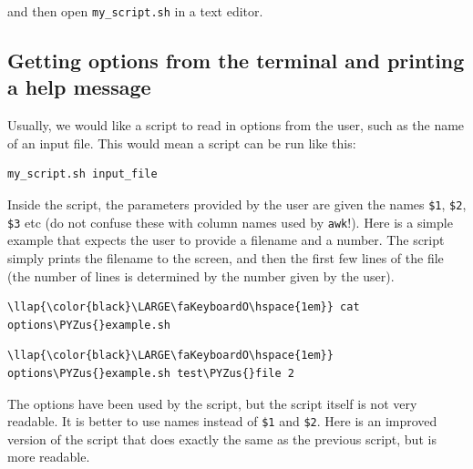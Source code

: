 \documentclass[11pt]{article}
\def\PYZus{\char`\_}
\begin{document}
and then open \texttt{my\_script.sh} in a text editor.

    \hypertarget{getting-options-from-the-terminal-and-printing-a-help-message}{%
\subsection{Getting options from the terminal and printing a help
message}\label{getting-options-from-the-terminal-and-printing-a-help-message}}

Usually, we would like a script to read in options from the user, such
as the name of an input file. This would mean a script can be run like
this:

\begin{verbatim}
my_script.sh input_file
\end{verbatim}

Inside the script, the parameters provided by the user are given the
names \texttt{\$1}, \texttt{\$2}, \texttt{\$3} etc (do not confuse these
with column names used by \texttt{awk}!). Here is a simple example that
expects the user to provide a filename and a number. The script simply
prints the filename to the screen, and then the first few lines of the
file (the number of lines is determined by the number given by the
user).

\begin{terminalinput}
\begin{Verbatim}[commandchars=\\\{\}]
\llap{\color{black}\LARGE\faKeyboardO\hspace{1em}} cat options\PYZus{}example.sh
\end{Verbatim}
\end{terminalinput}

\begin{terminalinput}
\begin{Verbatim}[commandchars=\\\{\}]
\llap{\color{black}\LARGE\faKeyboardO\hspace{1em}} options\PYZus{}example.sh test\PYZus{}file 2
\end{Verbatim}
\end{terminalinput}

    The options have been used by the script, but the script itself is not
very readable. It is better to use names instead of \texttt{\$1} and
\texttt{\$2}. Here is an improved version of the script that does
exactly the same as the previous script, but is more readable.
\end{document}
